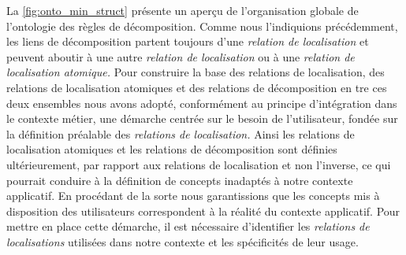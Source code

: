 La \autoref{fig:onto_min_struct} présente un aperçu de l'organisation
globale de l'ontologie des règles de décomposition. Comme nous
l'indiquions précédemment, les liens de décomposition partent toujours
d'une \emph{relation de localisation} et peuvent aboutir à une autre
\emph{relation de localisation} ou à une \emph{relation de
  localisation atomique.} Pour construire la base des relations de
localisation, des relations de localisation atomiques et des relations
de décomposition en tre ces deux ensembles nous avons adopté,
conformément au principe d'intégration dans le contexte métier, une
démarche centrée sur le besoin de l'utilisateur, \ie fondée sur la
définition préalable des \emph{relations de localisation.} Ainsi les
relations de localisation atomiques et les relations de décomposition
sont définies ultérieurement, par rapport aux relations de
localisation et non l'inverse, ce qui pourrait conduire à la
définition de concepts inadaptés à notre contexte applicatif.  En
procédant de la sorte nous garantissions que les concepts mis à
disposition des utilisateurs correspondent à la réalité du contexte
applicatif. Pour mettre en place cette démarche, il est nécessaire
d'identifier les \emph{relations de localisations} utilisées dans
notre contexte et les spécificités de leur usage.

